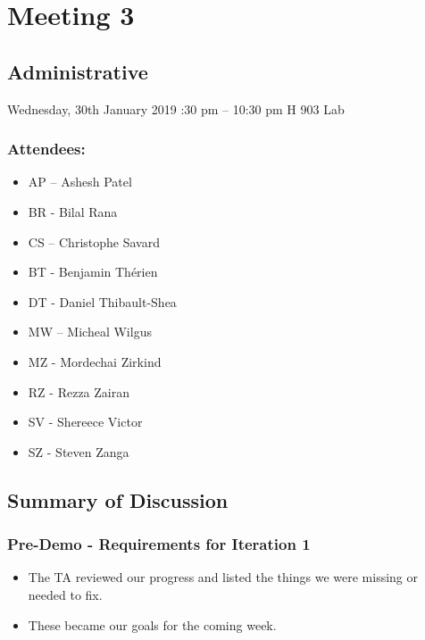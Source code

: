 \documentclass[12pt]{article}
\begin{document}
	\section{Meeting 3}
	
	\subsection{Administrative}
	Wednesday, 30th January 2019 :30 pm – 10:30 pm \textbar H 903 Lab 
	\subsubsection{Attendees:}

	\begin{itemize}
		\item AP – Ashesh Patel
		\item BR - Bilal Rana
		\item CS – Christophe Savard 
		\item BT - Benjamin Th\'erien
		\item DT - Daniel Thibault-Shea
		\item MW – Micheal Wilgus
		\item MZ - Mordechai Zirkind  
		\item RZ - Rezza Zairan 
		\item SV - Shereece Victor 
		\item SZ - Steven Zanga
		
	\end{itemize}
	
	\subsection{Summary of Discussion }
	\subsubsection{Pre-Demo - Requirements for Iteration 1}
	\begin{itemize}
		\item The TA reviewed our progress and listed the things we were missing or needed to fix.
		\item These became our goals for the coming week. 
			
	\end{itemize}
	
\end{document}
